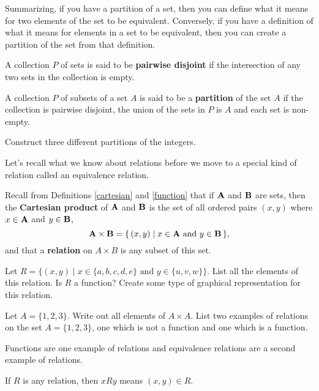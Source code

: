 Summarizing, if you have a partition of a set, then you can define what it means for two elements of the set to be equivalent.  Conversely, if you have a definition of what it means for elements in a set to be equivalent, then you can create a partition of the set from that definition.

\begin{dfn}
A collection $P$ of sets is said to be \textbf{pairwise disjoint} if the intersection of any two sets in the collection is empty.
\end{dfn}

\begin{dfn}
A collection $P$ of subsets of a set $A$ is said to be a \textbf{partition} of the set $A$ if the collection is pairwise disjoint, the union of the sets in $P$ is $A$ and each set is non-empty.
\end{dfn}

\begin{prb}
Construct three different partitions of the integers.
\end{prb}

Let's recall what we know about relations before we move to a special kind of relation called an equivalence relation.

Recall from Definitions \ref{cartesian} and \ref{function} that if $\mathbf A$ and $\mathbf B$ are sets, then the \textbf{Cartesian product} of $\mathbf A$ and $\mathbf B$ is the set of all ordered pairs $(x,y)$ where $x\in \mathbf A$ and $y\in \mathbf B$, $$ \mathbf A\times \mathbf B = \{\,(x,y) \mid x\in \mathbf A \mbox{ and } y\in \mathbf B\,\},$$ and that a \textbf{relation} on $A \times B$ is any subset of this set.

\begin{prb}
Let $R = \Big\{(x, y) \mid x \in \{a,b,c,d,e\} \mbox{ and } y \in \{u,v, w\}\Big\}.$ List all the elements of this relation. Is $R$ a function? Create some type of graphical representation for this relation.
\end{prb}

\begin{prb}
Let $A= \{1,2,3\}$.  Write out all elements of $A \times A$.  List two examples of relations on the set $A= \{1,2,3\}$, one which is not a function and one which is a function.
\end{prb}

Functions are one example of relations and equivalence relations are a second example of relations.

\begin{dfn}
If $R$ is any relation, then $xRy$ means $(x,y) \in R$.
\end{dfn}

